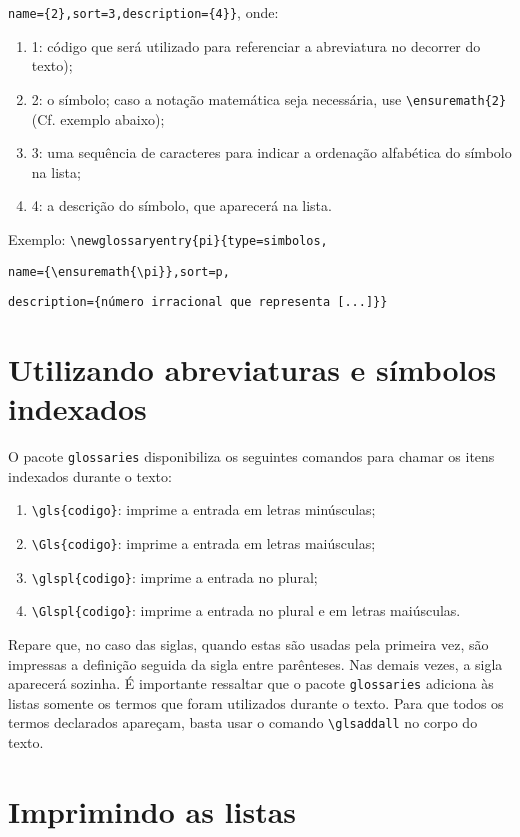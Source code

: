\documentclass{fei}
\begin{document}
	\verb+name={2},sort=3,description={4}}+, onde:
	
	\begin{enumerate}
	\item 1: código que será utilizado para referenciar a abreviatura no decorrer do texto);
	\item 2: o símbolo; caso a notação matemática seja necessária, use \verb+\ensuremath{2}+ (Cf. exemplo abaixo);
	\item 3: uma sequência de caracteres para indicar a ordenação alfabética do símbolo na lista;
	\item 4: a descrição do símbolo, que aparecerá na lista.
	\end{enumerate}
	
	Exemplo: \verb+\newglossaryentry{pi}{type=simbolos,+
	
			 \verb+name={\ensuremath{\pi}},sort=p,+
			 
			 \verb+description={número irracional que representa [...]}}+

	\section{Utilizando abreviaturas e símbolos indexados}
	
	O pacote \verb+glossaries+ disponibiliza os seguintes comandos para chamar os itens indexados durante o texto:
	
	\begin{enumerate}
	\item \verb+\gls{codigo}+: imprime a entrada em letras minúsculas;
	\item \verb+\Gls{codigo}+: imprime a entrada em letras maiúsculas;
	\item \verb+\glspl{codigo}+: imprime a entrada no plural;
	\item \verb+\Glspl{codigo}+: imprime a entrada no plural e em letras maiúsculas.
	\end{enumerate}
	
	Repare que, no caso das siglas, quando estas são usadas pela primeira vez, são impressas a definição seguida da sigla entre parênteses. Nas demais vezes, a sigla aparecerá sozinha. É importante ressaltar que o pacote \texttt{glossaries} adiciona às listas somente os termos que foram utilizados durante o texto. Para que todos os termos declarados apareçam, basta usar o comando \verb+\glsaddall+ no corpo do texto.
	
	\section{Imprimindo as listas}
	
\end{document}
